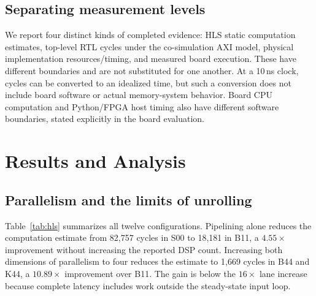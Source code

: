 \documentclass[11pt,letterpaper]{article}
\begin{document}
\subsection{Separating measurement levels}
We report four distinct kinds of completed evidence: HLS static computation
estimates, top-level RTL cycles under the co-simulation AXI model, physical
implementation resources/timing, and measured board execution. These have different boundaries and are not
substituted for one another. At a 10\,ns clock, cycles can be converted to an
idealized time, but such a conversion does not include board software or actual
memory-system behavior. Board CPU computation and Python/FPGA host timing also
have different software boundaries, stated explicitly in the board evaluation.

\section{Results and Analysis}
\subsection{Parallelism and the limits of unrolling}
Table~\ref{tab:hls} summarizes all twelve configurations. Pipelining alone
reduces the computation estimate from 82,757 cycles in S00 to 18,181 in B11,
a $4.55\times$ improvement without increasing the reported DSP count. Increasing
both dimensions of parallelism to four reduces the estimate to 1,669 cycles in
B44 and K44, a $10.89\times$ improvement over B11. The gain is below the
$16\times$ lane increase because complete latency includes work outside the
steady-state input loop.
\end{document}
